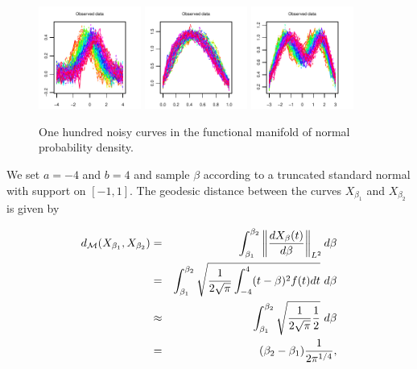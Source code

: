 \begin{figure}
\centering
\includegraphics[width=0.3\textwidth]{./graphics/sim_sce=2}
\includegraphics[width=0.3\textwidth]{./graphics/sim_sce=4}
\includegraphics[width=0.3\textwidth]{./graphics/sim_sce=5}
\caption{One hundred noisy curves in the functional manifold of normal probability density.}
\label{fig:sce2} %
\end{figure}

We set \(a=-4\) and \(b=4\) and sample \(\beta\) according to a
truncated standard normal with support on \([-1,1]\). The geodesic
distance between the curves \(X_{\beta_1}\) and \(X_{\beta_2}\) is given
by

\begin{eqnarray*}
d_{\mathcal{M}}(X_{\beta_1},X_{\beta_2}) &=& \int_{\beta_1}^{\beta_2} \left \| \frac{d X_\beta (t)}{d\beta} \right\|_{L^2} d\beta \\
&=&   \int_{\beta_1}^{\beta_2} \sqrt{ \frac{1}{2\sqrt{\pi}} \int_{-4}^4(t-\beta)^2 f(t) dt  }  \  d\beta   \\
&\approx&  \int_{\beta_1}^{\beta_2}  \sqrt{ \frac{1}{2\sqrt{\pi}} \frac{1}{2}} \ d\beta \\
&=& (\beta_2-\beta_1) \frac{1}{2\pi^{1/4}},
\end{eqnarray*}

